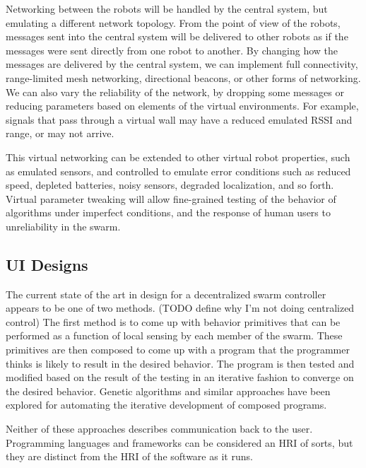 \documentclass[]{article}
\begin{document}
Networking between the robots will be handled by the central system, but emulating a different network topology. 
From the point of view of the robots, messages sent into the central system will be delivered to other robots as if the messages were sent directly from one robot to another. 
By changing how the messages are delivered by the central system, we can implement full connectivity, range-limited mesh networking, directional beacons, or other forms of networking. 
We can also vary the reliability of the network, by dropping some messages or reducing parameters based on elements of the virtual environments. 
For example, signals that pass through a virtual wall may have a reduced emulated RSSI and range, or may not arrive. 

This virtual networking can be extended to other virtual robot properties, such as emulated sensors, and controlled to emulate error conditions such as reduced speed, depleted batteries, noisy sensors, degraded localization, and so forth.
Virtual parameter tweaking will allow fine-grained testing of the behavior of algorithms under imperfect conditions, and the response of human users to unreliability in the swarm. 

\subsection{UI Designs}

The current state of the art in design for a decentralized swarm controller appears to be one of two methods. (TODO define why I'm not doing centralized control)
The first method is to come up with behavior primitives that can be performed as a function of local sensing by each member of the swarm. 
These primitives are then composed to come up with a program that the programmer thinks is likely to result in the desired behavior. 
The program is then tested and modified based on the result of the testing in an iterative fashion to converge on the desired behavior. 
Genetic algorithms and similar approaches have been explored for automating the iterative development of composed programs. 

Neither of these approaches describes communication back to the user. 
Programming languages and frameworks can be considered an HRI of sorts, but they are distinct from the HRI of the software as it runs. 
\end{document}
